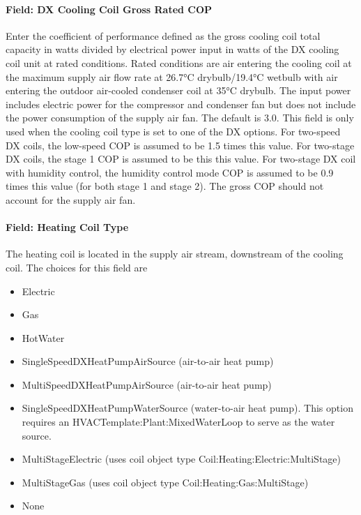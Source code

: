 \paragraph{Field: DX Cooling Coil Gross Rated COP}\label{field-dx-cooling-coil-gross-rated-cop}

Enter the coefficient of performance defined as the gross cooling coil total capacity in watts divided by electrical power input in watts of the DX cooling coil unit at rated conditions. Rated conditions are air entering the cooling coil at the maximum supply air flow rate at 26.7°C drybulb/19.4°C wetbulb with air entering the outdoor air-cooled condenser coil at 35°C drybulb. The input power includes electric power for the compressor and condenser fan but does not include the power consumption of the supply air fan. The default is 3.0. This field is only used when the cooling coil type is set to one of the DX options. For two-speed DX coils, the low-speed COP is assumed to be 1.5 times this value. For two-stage DX coils, the stage 1 COP is assumed to be this this value. For two-stage DX coil with humidity control, the humidity control mode COP is assumed to be 0.9 times this value (for both stage 1 and stage 2). The gross COP should not account for the supply air fan.

\paragraph{Field: Heating Coil Type}\label{field-heating-coil-type-3}

The heating coil is located in the supply air stream, downstream of the cooling coil. The choices for this field are

\begin{itemize}
\item
  Electric
\item
  Gas
\item
  HotWater
\item
  SingleSpeedDXHeatPumpAirSource (air-to-air heat pump)
\item
  MultiSpeedDXHeatPumpAirSource (air-to-air heat pump)
\item
  SingleSpeedDXHeatPumpWaterSource (water-to-air heat pump). This option requires an HVACTemplate:Plant:MixedWaterLoop to serve as the water source.
\item
  MultiStageElectric (uses coil object type Coil:Heating:Electric:MultiStage)
\item
  MultiStageGas (uses coil object type Coil:Heating:Gas:MultiStage)
\item
  None
\end{itemize}

